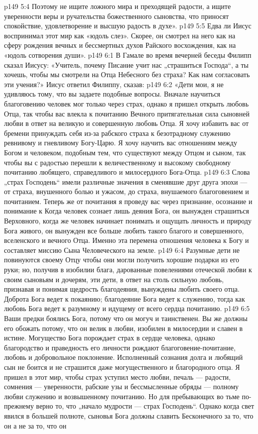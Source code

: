 \vs p149 5:4 Поэтому не ищите ложного мира и преходящей радости, а ищите уверенности веры и ручательства божественного сыновства, что приносят спокойствие, удовлетворение и высшую радость в духе».
\vs p149 5:5 \pc Едва ли Иисус воспринимал этот мир как «юдоль слез». Скорее, он смотрел на него как на сферу рождения вечных и бессмертных духов Райского восхождения, как на «юдоль сотворения души».
\vs p149 6:1 В Гамале во время вечерней беседы Филипп сказал Иисусу: «Учитель, почему Писание учит нас „страшиться Господа“, а ты хочешь, чтобы мы смотрели на Отца Небесного без страха? Как нам согласовать эти учения?» Иисус ответил Филиппу, сказав:
\vs p149 6:2 \pc «Дети мои, я не удивляюсь тому, что вы задаете подобные вопросы. Вначале научиться благоговению человек мог только через страх, однако я пришел открыть любовь Отца, так чтобы вас влекла к почитанию Вечного притягательная сила сыновней любви в ответ на великую и совершенную любовь Отца. Я хочу избавить вас от бремени принуждать себя из\hyp{}за рабского страха к безотрадному служению ревнивому и гневливому Богу\hyp{}Царю. Я хочу научить вас отношениям между Богом и человеком, подобным тем, что существуют между Отцом и сыном, так чтобы вы с радостью перешли к величественному и высокому свободному почитанию любящего, справедливого и милосердного Бога\hyp{}Отца.
\vs p149 6:3 Слова „страх Господень“ имели различные значения в сменявшие друг друга эпохи --- от страха, внушенного болью и ужасом, до страха, внушаемого благоговением и почитанием. Теперь же от почитания я проведу вас через признание, осознание и понимание к  Когда человек сознает лишь деяния Бога, он вынужден страшиться Верховного, когда же человек начинает понимать и ощущать личность и природу Бога живого, он вынужден все больше любить такого благого и совершенного, вселенского и вечного Отца. Именно эта перемена отношения человека к Богу и составляет миссию Сына Человеческого на земле.
\vs p149 6:4 Разумные дети не повинуются своему Отцу чтобы они могли получить хорошие подарки из его руки; но, получив в изобилии блага, дарованные повелениями отеческой любви к своим сыновьям и дочерям, эти дети, в ответ на столь сильную любовь, признавая и понимая щедрость благодеяния, вынуждены любить своего отца. Доброта Бога ведет к покаянию; благодеяние Бога ведет к служению, тогда как любовь Бога ведет к разумному и идущему от всего сердца почитанию.
\vs p149 6:5 Ваши предки боялись Бога, потому что он могуч и таинственен. Вы же должны его обожать потому, что он велик в любви, изобилен в милосердии и славен в истине. Могущество Бога порождает страх в сердце человека, однако благородство и праведность его личности рождают благоговение\hyp{}почитание, любовь и добровольное поклонение. Исполненный сознания долга и любящий сын не боится и не страшится даже могущественного и благородного отца. Я пришел в этот мир, чтобы страх уступил место любви, печаль --- радости, сомнения --- уверенности, рабские узы и бессмысленные обряды --- полному любви служению и возвышенному почитанию. Но для пребывающих во тьме по\hyp{}прежнему верно то, что „начало мудрости --- страх Господень“. Однако когда свет явился в большей полноте, сыновья Бога должны славить Бесконечного за то, что он  а не за то, что он 
